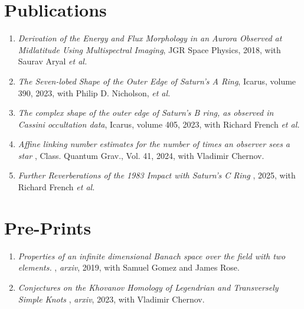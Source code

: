 \documentclass[a4paper,sans]{moderncv}
\begin{document}
    \section{Publications}
        \begin{enumerate}
            \item
                \textit{Derivation of the Energy and Flux Morphology in an
                Aurora Observed at Midlatitude Using Multispectral Imaging},
                JGR Space Physics, 2018, with Saurav Aryal \textit{et al.}
            \item
                \textit{The Seven-lobed Shape of the Outer
                Edge of Saturn’s A Ring}, Icarus, volume 390, 2023, with
                Philip D. Nicholson, \textit{et al.}
            \item
                \textit{The complex shape of the outer edge of Saturn’s B ring,
                as observed in Cassini occultation data},
                Icarus, volume 405, 2023, with Richard French \textit{et al.}
            \item
                \textit{%
                    Affine linking number estimates for the number of
                    times an observer sees a star%
                },
                Class. Quantum Grav., Vol. 41, 2024, with Vladimir Chernov.
            \item
                \textit{%
                    Further Reverberations of the 1983
                    Impact with Saturn’s C Ring
                },
                2025, with Richard French \textit{et al.}
        \end{enumerate}
    \section{Pre-Prints}
        \begin{enumerate}
            \item
                \textit{%
                    Properties of an infinite dimensional
                    Banach space over the field with two elements.%
                },
                \textit{arxiv}, 2019, with Samuel Gomez and James Rose.
            \item
                \textit{%
                    Conjectures on the Khovanov Homology of
                    Legendrian and Transversely Simple Knots%
                },
                \textit{arxiv}, 2023, with Vladimir Chernov.
        \end{enumerate}
\end{document}
